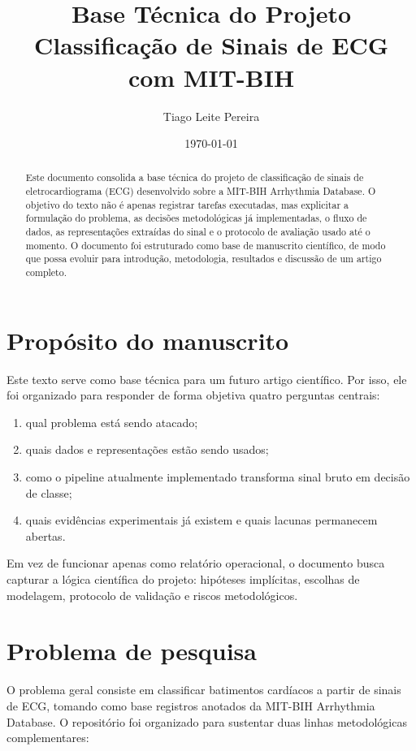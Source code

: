 \documentclass[12pt,a4paper]{article}
\title{Base T\'ecnica do Projeto\\Classifica\c{c}\~ao de Sinais de ECG com MIT-BIH}
\author{Tiago Leite Pereira}
\date{\today}
\begin{document}
\maketitle

\begin{abstract}
Este documento consolida a base t\'ecnica do projeto de classifica\c{c}\~ao de sinais de eletrocardiograma (ECG) desenvolvido sobre a MIT-BIH Arrhythmia Database. O objetivo do texto n\~ao \'e apenas registrar tarefas executadas, mas explicitar a formula\c{c}\~ao do problema, as decis\~oes metodol\'ogicas j\'a implementadas, o fluxo de dados, as representa\c{c}\~oes extra\'idas do sinal e o protocolo de avalia\c{c}\~ao usado at\'e o momento. O documento foi estruturado como base de manuscrito cient\'ifico, de modo que possa evoluir para introdu\c{c}\~ao, metodologia, resultados e discuss\~ao de um artigo completo.
\end{abstract}

\tableofcontents
\newpage

\section{Prop\'osito do manuscrito}
Este texto serve como base t\'ecnica para um futuro artigo cient\'ifico. Por isso, ele foi organizado para responder de forma objetiva quatro perguntas centrais:

\begin{enumerate}[label=\arabic*.]
    \item qual problema est\'a sendo atacado;
    \item quais dados e representa\c{c}\~oes est\~ao sendo usados;
    \item como o pipeline atualmente implementado transforma sinal bruto em decis\~ao de classe;
    \item quais evid\^encias experimentais j\'a existem e quais lacunas permanecem abertas.
\end{enumerate}

Em vez de funcionar apenas como relat\'orio operacional, o documento busca capturar a l\'ogica cient\'ifica do projeto: hip\'oteses impl\'icitas, escolhas de modelagem, protocolo de valida\c{c}\~ao e riscos metodol\'ogicos.

\section{Problema de pesquisa}
O problema geral consiste em classificar batimentos card\'iacos a partir de sinais de ECG, tomando como base registros anotados da MIT-BIH Arrhythmia Database. O reposit\'orio foi organizado para sustentar duas linhas metodol\'ogicas complementares:
\end{document}
